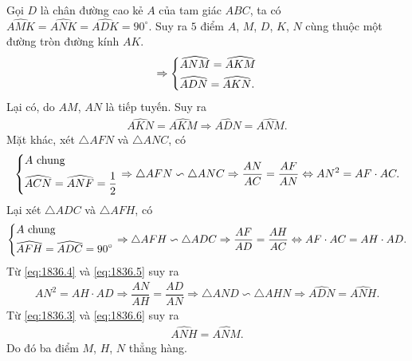 \begin{ex}
{\begin{enumerate}
\begin{center}
\begin{tikzpicture}
			\end{tikzpicture}
		\end{center}
		Gọi $ D $ là chân đường cao kẻ $ A $ của tam giác $ ABC $, ta có $ \widehat{AMK} = \widehat{ANK} = \widehat{ADK} = 90^\circ $. Suy ra $ 5 $ điểm $ A $, $ M $, $ D $, $ K $, $ N $ cùng thuộc một đường tròn đường kính $ AK $.
		\begin{align*}
			\Rightarrow \heva{& \widehat{ANM} = \widehat{AKM}\\& \widehat{ADN} = \widehat{AKN}.}
		\end{align*}
		Lại có, do $ AM $, $ AN $ là tiếp tuyến. Suy ra
		\begin{align}
			\widehat{AKN} = \widehat{AKM} \Rightarrow \widehat{ADN} = \widehat{ANM}. \label{eq:1836.3}
		\end{align}
		Mặt khác, xét $ \triangle AFN $ và $ \triangle ANC $, có
		\begin{align}
			\heva{& A \text{ chung}\\ & \widehat{ACN} = \widehat{ANF} = \dfrac{1}{2} } \Rightarrow \triangle AFN \backsim \triangle ANC \Rightarrow \dfrac{AN}{AC} = \dfrac{AF}{AN} \Leftrightarrow AN^2 = AF \cdot AC .\label{eq:1836.4}
		\end{align}
		Lại xét $ \triangle ADC $ và $ \triangle AFH $, có
		\begin{align}
			\heva{& A \text{ chung}\\ & \widehat{AFH} = \widehat{ADC} = 90^\circ } \Rightarrow \triangle AFH \backsim \triangle ADC \Rightarrow \dfrac{AF}{AD} = \dfrac{AH}{AC} \Leftrightarrow AF \cdot AC = AH \cdot AD .\label{eq:1836.5}
		\end{align}
		Từ \eqref{eq:1836.4} và \eqref{eq:1836.5} suy ra
		\begin{align}
			AN^2 = AH \cdot AD \Rightarrow \dfrac{AN}{AH} = \dfrac{AD}{AN} \Rightarrow \triangle AND \backsim \triangle AHN \Rightarrow \widehat{ADN} = \widehat{ANH}. \label{eq:1836.6}
		\end{align}
		Từ \eqref{eq:1836.3} và \eqref{eq:1836.6} suy ra
		\begin{align*}
			\widehat{ANH} = \widehat{ANM}.
		\end{align*}
		Do đó ba điểm $ M $, $ H $, $ N $ thẳng hàng.
	\end{enumerate}
	}
\end{ex}
